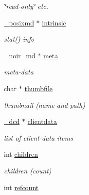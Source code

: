 \begin{CompactItemize}
\begin{CompactList}\small\item\em \char`\"{}read-only\char`\"{} etc. \item\end{CompactList}\item 
\hypertarget{struct__file__info_o7}{
\hyperlink{struct__posixmd}{\_\-posixmd} $\ast$ \hyperlink{struct__file__info_o7}{intrinsic}}
\label{struct__file__info_o7}

\begin{CompactList}\small\item\em stat()-info \item\end{CompactList}\item 
\hypertarget{struct__file__info_o8}{
\_\-noir\_\-md $\ast$ \hyperlink{struct__file__info_o8}{meta}}
\label{struct__file__info_o8}

\begin{CompactList}\small\item\em meta-data \item\end{CompactList}\item 
\hypertarget{struct__file__info_o9}{
char $\ast$ \hyperlink{struct__file__info_o9}{thumbfile}}
\label{struct__file__info_o9}

\begin{CompactList}\small\item\em thumbnail (name and path) \item\end{CompactList}\item 
\hypertarget{struct__file__info_o10}{
\hyperlink{struct__dcd}{\_\-dcd} $\ast$ \hyperlink{struct__file__info_o10}{clientdata}}
\label{struct__file__info_o10}

\begin{CompactList}\small\item\em list of client-data items \item\end{CompactList}\item 
\hypertarget{struct__file__info_o11}{
int \hyperlink{struct__file__info_o11}{children}}
\label{struct__file__info_o11}

\begin{CompactList}\small\item\em children (count) \item\end{CompactList}\item 
\hypertarget{struct__file__info_o12}{
int \hyperlink{struct__file__info_o12}{refcount}}
\label{struct__file__info_o12}


\end{CompactItemize}
